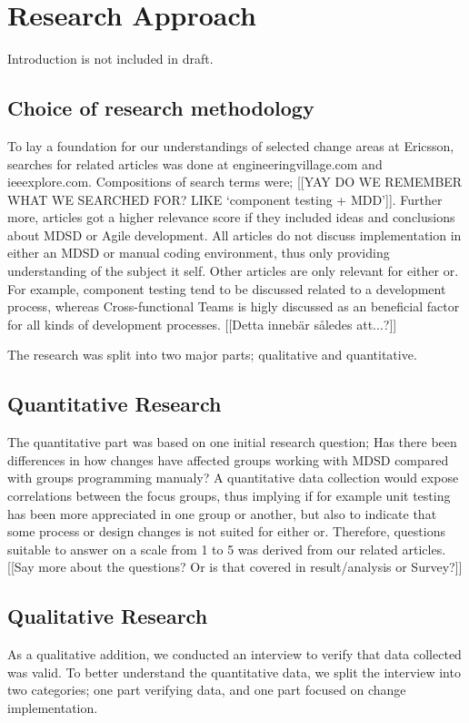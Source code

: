\documentclass[final_report_innit.tex]{subfiles}
\begin{document}
\section{Research Approach}
Introduction is not included in draft.

\subsection*{Choice of research methodology}
	
To lay a foundation for our understandings of selected change areas at Ericsson, searches for related articles was done at engineeringvillage.com and ieeexplore.com. Compositions of search terms were; [[YAY DO WE REMEMBER WHAT WE SEARCHED FOR? LIKE `component testing + MDD']]. Further more, articles got a higher relevance score if they included ideas and conclusions about MDSD or Agile development. All articles do not discuss implementation in either an MDSD or manual coding environment, thus only providing understanding of the subject it self. Other articles are only relevant for either or. For example, component testing tend to be discussed related to a development process, whereas Cross-functional Teams is higly discussed as an beneficial factor for all kinds of development processes. [[Detta innebär således att...?]]

The research was split into two major parts; qualitative and quantitative.

\subsection*{Quantitative Research}

The quantitative part was based on one initial research question; Has there been differences in how changes have affected groups working with MDSD compared with groups programming manualy?	A quantitative data collection would expose correlations between the focus groups, thus implying if for example unit testing has been more appreciated in one group or another, but also to indicate that some process or design changes is not suited for either or. Therefore, questions suitable to answer on a scale from 1 to 5 was derived from our related articles. [[Say more about the questions? Or is that covered in result/analysis or Survey?]]

\subsection*{Qualitative Research}

As a qualitative addition, we conducted an interview to verify that data collected was valid. To better understand the quantitative data, we split the interview into two categories; one part verifying data, and one part focused on change implementation.
\end{document}

